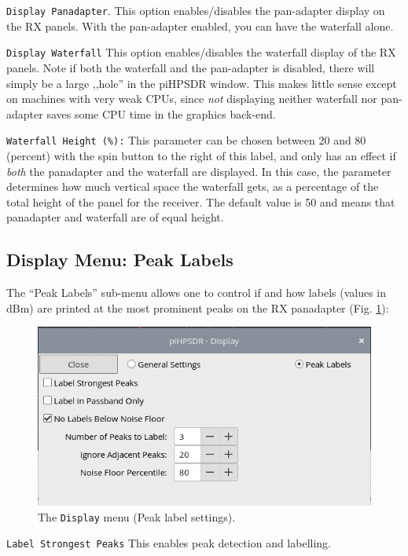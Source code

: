 \documentclass[12pt]{book}
\def\rett#1{\texttt{\color{red}#1}}
\def\bltt#1{\texttt{\color{blue}#1}}
\def\pH{pi\-HPSDR\xspace}
\begin{document}
\rett{Display Panadapter}. This option enables/disables the pan-adapter display
on the RX panels. With the pan-adapter enabled, you can have the waterfall alone.

\rett{Display Waterfall} This option enables/disables the waterfall display
of the RX panels. Note if both the waterfall and the pan-adapter is disabled,
there will simply be a large ,,hole'' in the \pH window. This makes little sense
except on machines with very weak CPUs, since \textit{not} displaying neither waterfall
nor pan-adapter saves some CPU time in the graphics back-end.

\rett{Waterfall Height (\%):} This parameter can be chosen between 20 and 80
(percent) with the spin button to the right of this label,
and only has an effect if \textit{both} the panadapter and the waterfall are displayed.
In this case, the parameter determines how much vertical space
the waterfall gets, as a percentage of the total height of the panel for the
receiver. The default value is 50 and means that panadapter and waterfall
are of equal height.

\subsection{Display Menu: Peak Labels}

The ``Peak Labels'' sub-menu allows one to control if and how labels
(values in dBm) are printed at the most prominent peaks on the
RX panadapter (Fig. \ref{fig:DisplayMenuPeak}):


\begin{figure}[ht]
\center
\includegraphics[scale=0.45]{DisplayMenuPeak.png}
\caption{The \bltt{Display} menu (Peak label settings).}
\label{fig:DisplayMenuPeak}
\end{figure}

\rett{Label Strongest Peaks} This enables peak detection and labelling.
\end{document}
